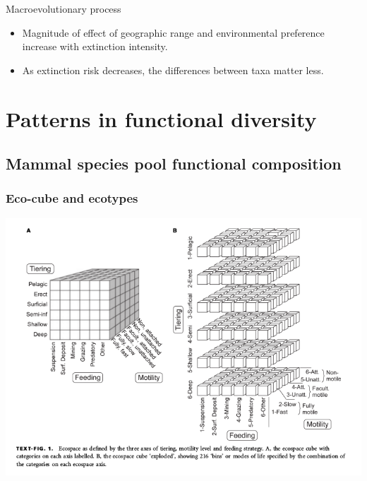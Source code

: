 \documentclass{beamer}
\begin{document}
\begin{frame}
  \begin{alertblock}{Macroevolutionary process}
    \begin{itemize}
      \item Magnitude of effect of geographic range and environmental preference increase with extinction intensity.
      \item As extinction risk decreases, the differences between taxa matter less.
    \end{itemize}
  \end{alertblock}
\end{frame}



\section{Patterns in functional diversity}
\subsection{Mammal species pool functional composition}


\begin{frame}
  \begin{center}
  \end{center}

\end{frame}

\begin{frame}
  \frametitle{Eco-cube and ecotypes}

  \begin{center}
    \includegraphics[height=0.8\textheight,width=\textwidth,keepaspectratio=true]{figure/ecocube}
  \end{center}

\end{frame}
\end{document}
